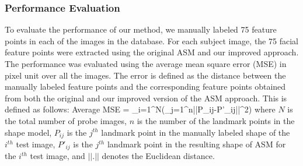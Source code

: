 \subsubsection{Performance Evaluation} To evaluate the performance of
our method, we manually labeled 75 feature points in each of the
images in the database. For each subject image, the 75 facial
feature points were extracted using the original ASM and our
improved approach. The performance was evaluated using the average
mean square error (MSE) in pixel unit over all the images. The error
is defined as the distance between the manually labeled feature
points and the corresponding feature points obtained from both the
original and our improved version of the ASM approach. This is
defined as follows:
\beq Average MSE =
\sum_{i=1}^{N}(\sum_{j=1}^{n}||P_{ij}-P'_{ij}||^2)
\eeq
where $N$ is the total number of probe images, $n$ is the number of
the landmark points in the shape model, $P_{ij}$ is the $j^{th}$
landmark point in the manually labeled shape of the $i^{th}$ test
image, $P'_{ij}$ is the $j^{th}$ landmark point in the resulting
shape of ASM for the $i^{th}$ test image, and $||.||$ denotes the
Euclidean distance.

